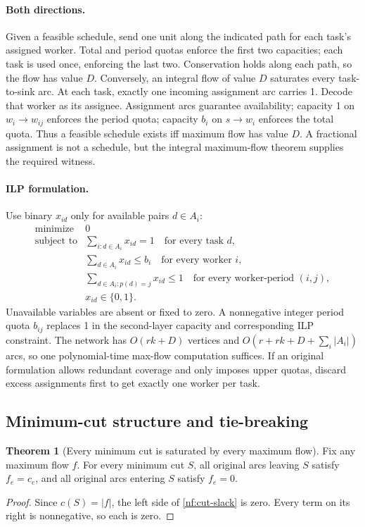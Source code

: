 \documentclass[10pt]{article}
\theoremstyle{definition}
\newtheorem{theorem}[definition]{Theorem}
\begin{document}
\paragraph{Both directions.}
Given a feasible schedule, send one unit along the indicated path for each
task's assigned worker. Total and period quotas enforce the first two
capacities; each task is used once, enforcing the last two. Conservation
holds along each path, so the flow has value $D$.
Conversely, an integral flow of value $D$ saturates every task-to-sink arc.
At each task, exactly one incoming assignment arc carries 1. Decode that
worker as its assignee. Assignment arcs guarantee availability; capacity 1
on $w_i\to w_{ij}$ enforces the period quota; capacity $b_i$ on $s\to w_i$
enforces the total quota. Thus a feasible schedule exists iff maximum flow
has value $D$. A fractional assignment is not a schedule, but the integral
maximum-flow theorem supplies the required witness.

\paragraph{ILP formulation.}
Use binary $x_{id}$ only for available pairs $d\in A_i$:
\[
\begin{array}{rl}
 \text{minimize}&0\\[1mm]
 \text{subject to}&\displaystyle\sum_{i:d\in A_i}x_{id}=1
                    \quad\text{for every task }d,\\[2mm]
 &\displaystyle\sum_{d\in A_i}x_{id}\le b_i
                    \quad\text{for every worker }i,\\[2mm]
 &\displaystyle\sum_{d\in A_i:p(d)=j}x_{id}\le1
                    \quad\text{for every worker-period }(i,j),\\[2mm]
 &x_{id}\in\{0,1\}.
\end{array}
\]
Unavailable variables are absent or fixed to zero. A nonnegative integer period quota $b_{ij}$
replaces 1 in the second-layer capacity and corresponding ILP constraint.
The network has $O(rk+D)$ vertices and
$O(r+rk+D+\sum_i|A_i|)$ arcs, so one polynomial-time max-flow computation
suffices. If an original formulation allows redundant coverage and only
imposes upper quotas, discard excess assignments first to get exactly one
worker per task.

\subsection{Minimum-cut structure and tie-breaking}\label{nf:cut-structure}
\begin{theorem}[Every minimum cut is saturated by every maximum flow]
Fix any maximum flow $f$. For every minimum cut $S$, all original arcs
leaving $S$ satisfy $f_e=c_e$, and all original arcs entering $S$ satisfy
$f_e=0$.
\end{theorem}
\begin{proof}
Since $c(S)=|f|$, the left side of \eqref{nf:cut-slack} is zero.
Every term on its right is nonnegative, so each is zero.
\end{proof}
\end{document}
